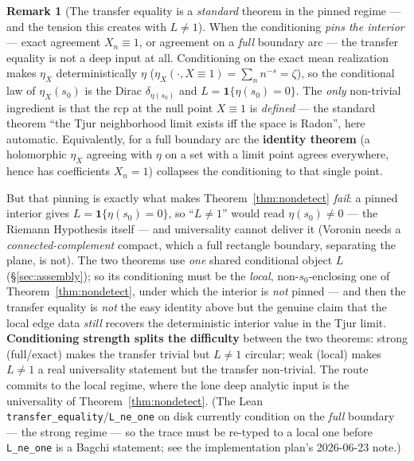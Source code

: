 \documentclass[11pt,a4paper]{article}
\theoremstyle{definition}
\newtheorem{remark}[theorem]{Remark}
\newcommand{\etaX}{\eta_X}
\begin{document}
\begin{remark}[The transfer equality is a \emph{standard} theorem in the pinned regime --- and the
tension this creates with \(L\neq1\)]\label{rem:tradeoff}
When the conditioning \emph{pins the interior} --- exact agreement \(X_n\equiv1\), or agreement on a
\emph{full} boundary arc --- the transfer equality is not a deep input at all. Conditioning on the
exact mean realization makes \(\etaX\) deterministically \(\eta\)
(\(\etaX(\cdot,X\!\equiv\!1)=\sum_n n^{-s}=\zeta\)), so the conditional law of \(\etaX(s_0)\) is the
Dirac \(\delta_{\eta(s_0)}\) and \(L=\mathbf{1}\{\eta(s_0)=0\}\). The \emph{only} non-trivial
ingredient is that the rcp at the null point \(X\!\equiv\!1\) is \emph{defined} --- the standard
theorem ``the Tjur neighborhood limit exists iff the space is Radon'', here automatic. Equivalently,
for a full boundary arc the \textbf{identity theorem} (a holomorphic \(\etaX\) agreeing with \(\eta\)
on a set with a limit point agrees everywhere, hence has coefficients \(X_n=1\)) collapses the
conditioning to that single point.

But that pinning is exactly what makes Theorem~\ref{thm:nondetect} \emph{fail}: a pinned interior
gives \(L=\mathbf{1}\{\eta(s_0)=0\}\), so ``\(L\neq1\)'' would read \(\eta(s_0)\neq0\) --- the Riemann
Hypothesis itself --- and universality cannot deliver it (Voronin needs a \emph{connected-complement}
compact, which a full rectangle boundary, separating the plane, is not). The two theorems use
\emph{one} shared conditional object \(L\) (\S\ref{sec:assembly}); so its conditioning must be the
\emph{local}, non-\(s_0\)-enclosing one of Theorem~\ref{thm:nondetect}, under which the interior is
\emph{not} pinned --- and then the transfer equality is \emph{not} the easy identity above but the
genuine claim that the local edge data \emph{still} recovers the deterministic interior value in the
Tjur limit. \textbf{Conditioning strength splits the difficulty} between the two theorems: strong
(full/exact) makes the transfer trivial but \(L\neq1\) circular; weak (local) makes \(L\neq1\) a real
universality statement but the transfer non-trivial. The route commits to the local regime, where
the lone deep analytic input is the universality of Theorem~\ref{thm:nondetect}. (The Lean
\texttt{transfer\_equality}/\texttt{L\_ne\_one} on disk currently condition on the \emph{full}
boundary --- the strong regime --- so the trace must be re-typed to a local one before
\texttt{L\_ne\_one} is a Bagchi statement; see the implementation plan's 2026-06-23 note.)
\end{remark}
\end{document}

